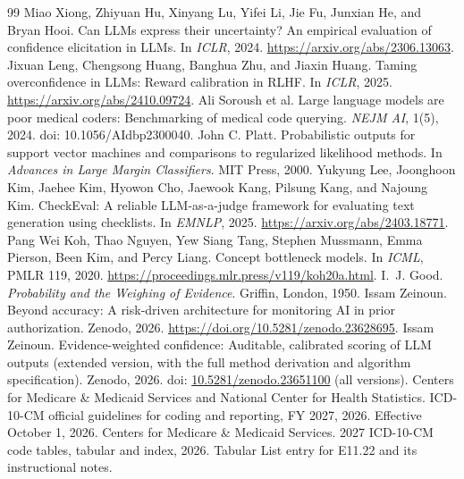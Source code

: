 \documentclass[10pt,letterpaper]{article}
\begin{document}
\begin{thebibliography}{99}\small
{} Miao Xiong, Zhiyuan Hu, Xinyang Lu, Yifei Li, Jie Fu, Junxian He, and Bryan Hooi. Can LLMs express their uncertainty? An empirical evaluation of confidence elicitation in LLMs. In \emph{ICLR}, 2024. \url{https://arxiv.org/abs/2306.13063}.
 Jixuan Leng, Chengsong Huang, Banghua Zhu, and Jiaxin Huang. Taming overconfidence in LLMs: Reward calibration in RLHF. In \emph{ICLR}, 2025. \url{https://arxiv.org/abs/2410.09724}.
 Ali Soroush et al. Large language models are poor medical coders: Benchmarking of medical code querying. \emph{NEJM AI}, 1(5), 2024. doi: 10.1056/AIdbp2300040.
 John C. Platt. Probabilistic outputs for support vector machines and comparisons to regularized likelihood methods. In \emph{Advances in Large Margin Classifiers}. MIT Press, 2000.
 Yukyung Lee, Joonghoon Kim, Jaehee Kim, Hyowon Cho, Jaewook Kang, Pilsung Kang, and Najoung Kim. CheckEval: A reliable LLM-as-a-judge framework for evaluating text generation using checklists. In \emph{EMNLP}, 2025. \url{https://arxiv.org/abs/2403.18771}.
 Pang Wei Koh, Thao Nguyen, Yew Siang Tang, Stephen Mussmann, Emma Pierson, Been Kim, and Percy Liang. Concept bottleneck models. In \emph{ICML}, PMLR 119, 2020. \url{https://proceedings.mlr.press/v119/koh20a.html}.
 I.~J. Good. \emph{Probability and the Weighing of Evidence}. Griffin, London, 1950.
 Issam Zeinoun. Beyond accuracy: A risk-driven architecture for monitoring AI in prior authorization. Zenodo, 2026. \url{https://doi.org/10.5281/zenodo.23628695}.
 Issam Zeinoun. Evidence-weighted confidence: Auditable, calibrated scoring of LLM outputs (extended version, with the full method derivation and algorithm specification). Zenodo, 2026. doi: \href{https://doi.org/10.5281/zenodo.23651100}{10.5281/zenodo.23651100} (all versions).
 Centers for Medicare \& Medicaid Services and National Center for Health Statistics. ICD-10-CM official guidelines for coding and reporting, FY 2027, 2026. Effective October 1, 2026.
 Centers for Medicare \& Medicaid Services. 2027 ICD-10-CM code tables, tabular and index, 2026. Tabular List entry for E11.22 and its instructional notes.
\end{thebibliography}

\appendix
\end{document}
